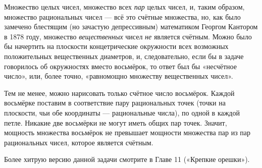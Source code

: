 \medskip

Множество целых чисел, множество всех \emph{пар} целых чисел, и, таким образом, множество рациональных чисел --- всё это счётные множества, но, как было замечено блестящим (но зачастую депрессивным) математиком Георгом Кантором в 1878 году, множество \emph{вещественных} чисел \emph{не} является счётным.
Можно было бы начертить на плоскости концетрические окружности всех возможных положительных вещественных диаметров, и, следовательно, если бы в задаче говорилось об окружностях вместо восьмёрок, то ответ был бы «несчётное число», или, более точно, «равномощно множеству вещественных чисел».

Тем не менее, можно нарисовать только счётное число восьмёрок.
Каждой восьмёрке поставим в соответствие пару рациональных точек (точки на плоскости, чьи обе координаты --- рациональные числа), по одной в каждой петле.
Никакие две восьмёрки не могут иметь общих пар точек.
Значит, мощность множества восьмёрок не превышает мощности множества пар из пар рациональных чисел, которое является счётным.\heart

{

\sloppy

Более хитрую версию данной задачи смотрите в Главе 11 («Крепкие орешки»).

}

